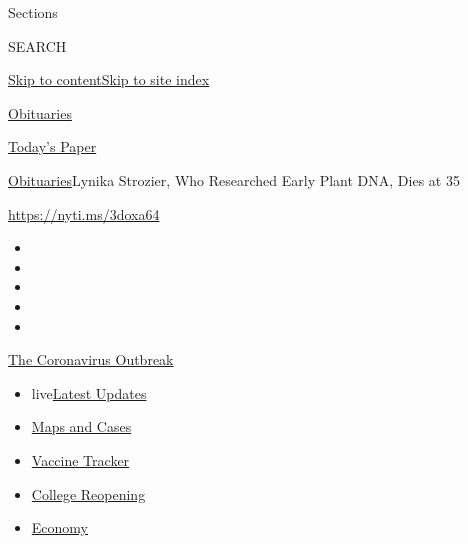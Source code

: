 Sections

SEARCH

\protect\hyperlink{site-content}{Skip to
content}\protect\hyperlink{site-index}{Skip to site index}

\href{https://www.nytimes.com/section/obituaries}{Obituaries}

\href{https://myaccount.nytimes.com/auth/login?response_type=cookie\&client_id=vi}{}

\href{https://www.nytimes.com/section/todayspaper}{Today's Paper}

\href{/section/obituaries}{Obituaries}\textbar{}Lynika Strozier, Who
Researched Early Plant DNA, Dies at 35

\url{https://nyti.ms/3doxa64}

\begin{itemize}
\item
\item
\item
\item
\item
\end{itemize}

\href{https://www.nytimes.com/news-event/coronavirus?action=click\&pgtype=Article\&state=default\&region=TOP_BANNER\&context=storylines_menu}{The
Coronavirus Outbreak}

\begin{itemize}
\tightlist
\item
  live\href{https://www.nytimes.com/2020/08/03/world/coronavirus-covid-19.html?action=click\&pgtype=Article\&state=default\&region=TOP_BANNER\&context=storylines_menu}{Latest
  Updates}
\item
  \href{https://www.nytimes.com/interactive/2020/us/coronavirus-us-cases.html?action=click\&pgtype=Article\&state=default\&region=TOP_BANNER\&context=storylines_menu}{Maps
  and Cases}
\item
  \href{https://www.nytimes.com/interactive/2020/science/coronavirus-vaccine-tracker.html?action=click\&pgtype=Article\&state=default\&region=TOP_BANNER\&context=storylines_menu}{Vaccine
  Tracker}
\item
  \href{https://www.nytimes.com/2020/08/02/us/covid-college-reopening.html?action=click\&pgtype=Article\&state=default\&region=TOP_BANNER\&context=storylines_menu}{College
  Reopening}
\item
  \href{https://www.nytimes.com/live/2020/08/03/business/stock-market-today-coronavirus?action=click\&pgtype=Article\&state=default\&region=TOP_BANNER\&context=storylines_menu}{Economy}
\end{itemize}

